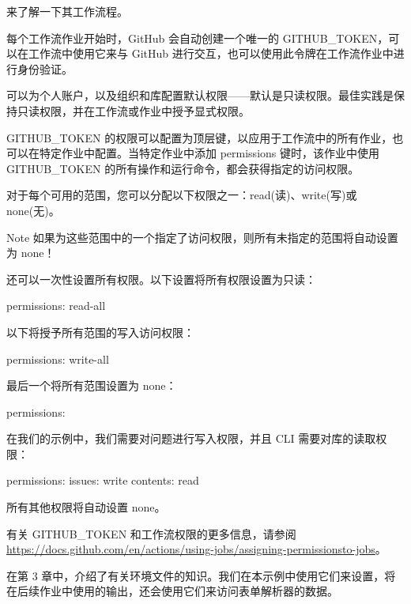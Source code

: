 来了解一下其工作流程。


每个工作流作业开始时，GitHub 会自动创建一个唯一的 GITHUB\_TOKEN，可以在工作流中使用它来与 GitHub 进行交互，也可以使用此令牌在工作流作业中进行身份验证。

可以为个人账户，以及组织和库配置默认权限——默认是只读权限。最佳实践是保持只读权限，并在工作流或作业中授予显式权限。

GITHUB\_TOKEN 的权限可以配置为顶层键，以应用于工作流中的所有作业，也可以在特定作业中配置。当特定作业中添加 permissions 键时，该作业中使用 GITHUB\_TOKEN 的所有操作和运行命令，都会获得指定的访问权限。

对于每个可用的范围，您可以分配以下权限之一：read(读)、write(写)或 none(无)。

\begin{myNotic}{Note}
如果为这些范围中的一个指定了访问权限，则所有未指定的范围将自动设置为 none！
\end{myNotic}

还可以一次性设置所有权限。以下设置将所有权限设置为只读：

\begin{shell}
permissions: read-all
\end{shell}

以下将授予所有范围的写入访问权限：

\begin{shell}
permissions: write-all
\end{shell}

最后一个将所有范围设置为 none：

\begin{shell}
permissions: {}
\end{shell}

在我们的示例中，我们需要对问题进行写入权限，并且 CLI 需要对库的读取权限：

\begin{shell}
permissions:
  issues: write
  contents: read
\end{shell}

所有其他权限将自动设置 none。

有关 GITHUB\_TOKEN 和工作流权限的更多信息，请参阅 \url{https://docs.github.com/en/actions/using-jobs/assigning-permissionsto-jobs}。


在第 3 章中，介绍了有关环境文件的知识。我们在本示例中使用它们来设置，将在后续作业中使用的输出，还会使用它们来访问表单解析器的数据。

